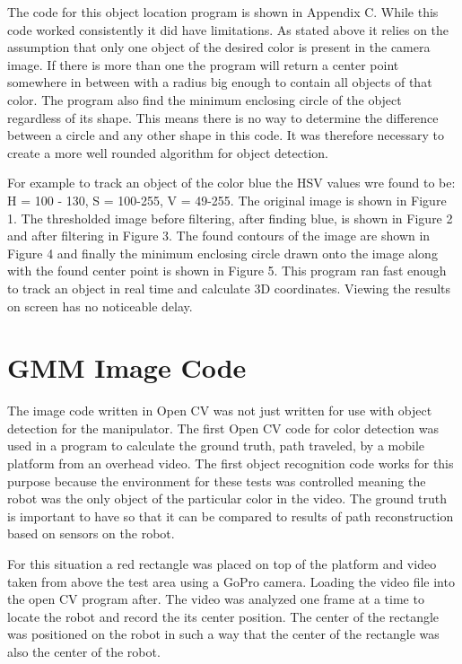 \documentclass[letterpaper,12pt]{report}
\begin{document}
The code for this object location program is shown in Appendix C. While this code worked consistently it did have limitations. As stated above it relies on the assumption that only one object of the desired color is present in the camera image. If there is more than one the program will return a center point somewhere in between with a radius big enough to contain all objects of that color. The program also find the minimum enclosing circle of the object regardless of its shape. This means there is no way to determine the difference between a circle and any other shape in this code. It was therefore necessary to create a more well rounded algorithm for object detection.

For example to track an object of the color blue the HSV values wre found to be: H = 100 - 130, S = 100-255, V = 49-255. The original image is shown in Figure 1. The thresholded image before filtering, after finding blue, is shown in Figure 2 and after filtering in Figure 3. The found contours of the image are shown in Figure 4 and finally the minimum enclosing circle drawn onto the image along with the found center point is shown in Figure 5. This program ran fast enough to track an object in real time and calculate 3D coordinates. Viewing the results on screen has no noticeable delay.

\chapter{GMM Image Code}
The image code written in Open CV was not just written for use with object detection for the manipulator. The first Open CV code for color detection was used in a program to calculate the ground truth, path traveled, by a mobile platform from an overhead video. The first object recognition code works for this purpose because the environment for these tests was controlled meaning the robot was the only object of the particular color in the video. The ground truth is important to have so that it can be compared to results of path reconstruction based on sensors on the robot.

For this situation a red rectangle was placed on top of the platform and video taken from above the test area using a GoPro camera. Loading the video file into the open CV program after. The video was analyzed one frame at a time to locate the robot and record the its center position. The center of the rectangle was positioned on the robot in such a way that the center of the rectangle was also the center of the robot. 
\end{document}
